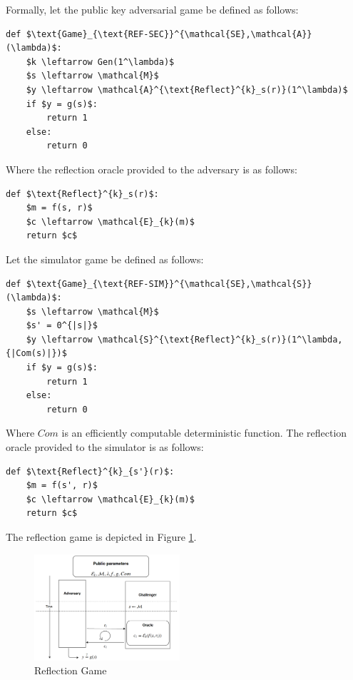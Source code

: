 Formally, let the public key adversarial game be defined as follows:

\begin{lstlisting}[texcl,mathescape,basicstyle=\small]
def $\text{Game}_{\text{REF-SEC}}^{\mathcal{SE},\mathcal{A}}(\lambda)$:
    $k \leftarrow Gen(1^\lambda)$
    $s \leftarrow \mathcal{M}$
    $y \leftarrow \mathcal{A}^{\text{Reflect}^{k}_s(r)}(1^\lambda)$
    if $y = g(s)$:
        return 1
    else:
        return 0
\end{lstlisting}

Where the reflection oracle provided to the adversary is as follows:

\begin{lstlisting}[texcl,mathescape,basicstyle=\small]
def $\text{Reflect}^{k}_s(r)$:
    $m = f(s, r)$
    $c \leftarrow \mathcal{E}_{k}(m)$
    return $c$
\end{lstlisting}

Let the simulator game be defined as follows:

\begin{lstlisting}[texcl,mathescape,basicstyle=\small]
def $\text{Game}_{\text{REF-SIM}}^{\mathcal{SE},\mathcal{S}}(\lambda)$:
    $s \leftarrow \mathcal{M}$
    $s' = 0^{|s|}$
    $y \leftarrow \mathcal{S}^{\text{Reflect}^{k}_s(r)}(1^\lambda, {|Com(s)|})$
    if $y = g(s)$:
        return 1
    else:
        return 0
\end{lstlisting}

Where $Com$ is an efficiently computable deterministic function. The reflection
oracle provided to the simulator is as follows:

\begin{lstlisting}[texcl,mathescape,basicstyle=\small]
def $\text{Reflect}^{k}_{s'}(r)$:
    $m = f(s', r)$
    $c \leftarrow \mathcal{E}_{k}(m)$
    return $c$
\end{lstlisting}

The reflection game is depicted in Figure \ref{fig:refgame}.

    \begin{figure}[thpb]
        \centering
            \includegraphics[width=0.48\textwidth]{figures/reflection_game.png}
        \caption{Reflection Game}
        \label{fig:refgame}
    \end{figure}

